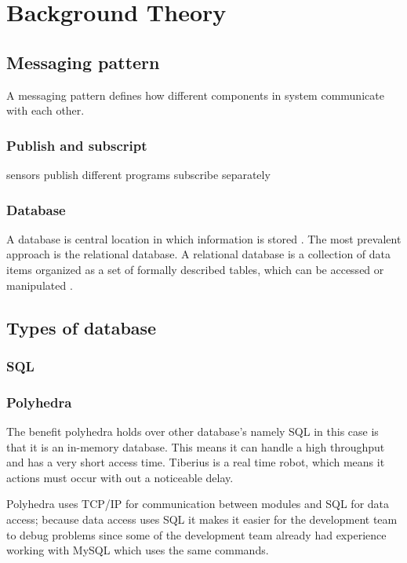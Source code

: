 \section{Background Theory}

\subsection{Messaging pattern}
A messaging pattern defines how different components in system communicate with each other.

\subsubsection{Publish and subscript}
sensors publish
different programs subscribe separately

\subsubsection{Database}
A database is central location in which information is stored \cite{databasedefinition}. The most prevalent approach is the relational database. A relational database is a collection of data items organized as a set of formally described tables, which can be accessed or manipulated \cite{relationaldatabasedefinition}.

\subsection{Types of database}

\subsubsection{SQL}

\subsubsection{Polyhedra}
The benefit polyhedra holds over other database's namely SQL in this case is that it is an in-memory database. This means it can handle a high throughput and has a very short access time. Tiberius is a real time robot, which means it actions must occur with out a noticeable delay. 

Polyhedra uses TCP/IP for communication between modules and SQL for data access; because data access uses SQL it makes it easier for the development team to debug problems since some of the development team already had experience working with MySQL which uses the same commands. 
